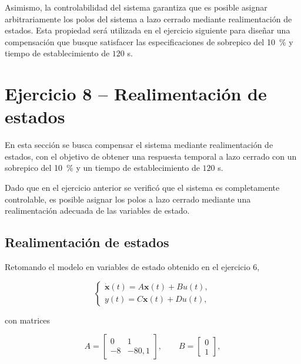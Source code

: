 \documentclass[10pt]{article}
\begin{document}
Asimismo, la controlabilidad del sistema garantiza
que es posible asignar arbitrariamente los polos
del sistema a lazo cerrado mediante realimentación
de estados. Esta propiedad será utilizada en el
ejercicio siguiente para diseñar una compensación
que busque satisfacer las especificaciones de
sobrepico del 10~\% y tiempo de establecimiento
de $120$ s.




\clearpage
\setcounter{section}{8}
\setcounter{subsection}{0}
\section*{Ejercicio 8 -- Realimentación de estados}

En esta sección se busca compensar el sistema mediante
realimentación de estados, con el objetivo de obtener
una respuesta temporal a lazo cerrado con un sobrepico
del 10~\% y un tiempo de establecimiento de $120$ s.

Dado que en el ejercicio anterior se verificó que el
sistema es completamente controlable, es posible asignar
los polos a lazo cerrado mediante una realimentación
adecuada de las variables de estado.


\subsection{Realimentación de estados}

Retomando el modelo en variables de estado obtenido
en el ejercicio 6,

\begin{equation}
    \begin{cases}
        \dot{\mathbf{x}}(t)=A\mathbf{x}(t)+Bu(t),\\
        y(t)=C\mathbf{x}(t)+Du(t),
    \end{cases}
\end{equation}

con matrices

\begin{equation}
    A=
    \begin{bmatrix}
        0 & 1\\
        -8 & -80{,}1
    \end{bmatrix},
    \qquad
    B=
    \begin{bmatrix}
        0\\
        1
    \end{bmatrix},
\end{equation}
\end{document}
